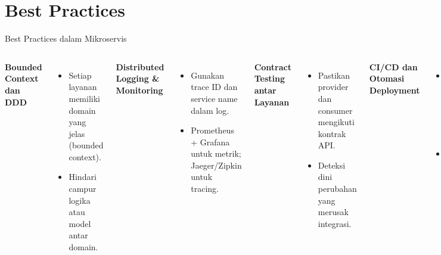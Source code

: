 \documentclass[aspectratio=169, table]{beamer}
\begin{document}
\section{Best Practices}
\begin{frame}[fragile]{Best Practices dalam Mikroservis}
	\vspace{20pt}
	\small
	\begin{columns}[T]
		\textbf{Bounded Context dan DDD}
		\begin{itemize}
			\item Setiap layanan memiliki domain yang jelas (bounded context).
			\item Hindari campur logika atau model antar domain.
		\end{itemize}
		
		\vspace{5pt}
		\textbf{Distributed Logging \& Monitoring}
		\begin{itemize}
			\item Gunakan trace ID dan service name dalam log.
			\item Prometheus + Grafana untuk metrik; Jaeger/Zipkin untuk tracing.
		\end{itemize}
		
		\textbf{Contract Testing antar Layanan}
		\begin{itemize}
			\item Pastikan provider dan consumer mengikuti kontrak API.
			\item Deteksi dini perubahan yang merusak integrasi.
		\end{itemize}
		
		\vspace{5pt}
		\textbf{CI/CD dan Otomasi Deployment}
		\begin{itemize}
			\item Build dan test tiap layanan secara mandiri.
			\item Gunakan GitHub Actions, GitLab CI/CD, Jenkins, ArgoCD, Helm.
		\end{itemize}
	\end{columns}
\end{frame}
\end{document}
